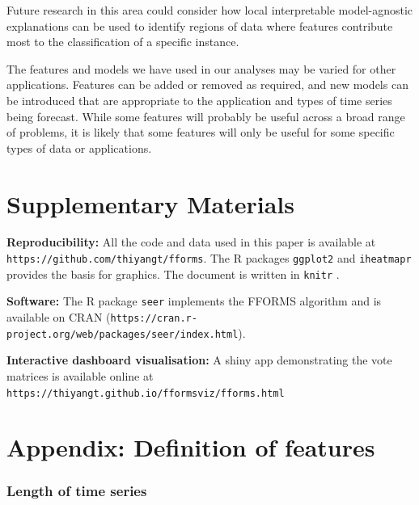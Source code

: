 \documentclass[11pt,a4paper,]{article}
\begin{document}
Future research in this area could consider how local interpretable model-agnostic explanations can be used to identify regions of data where features contribute most to the classification of a specific instance.

The features and models we have used in our analyses may be varied for other applications. Features can be added or removed as required, and new models can be introduced that are appropriate to the application and types of time series being forecast. While some features will probably be useful across a broad range of problems, it is likely that some features will only be useful for some specific types of data or applications.

\hypertarget{supplementary-materials}{%
\section*{Supplementary Materials}\label{supplementary-materials}}

\textbf{Reproducibility:} All the code and data used in this paper is available at \texttt{https://github.com/thiyangt/fforms}. The R packages \texttt{ggplot2} \autocite{ggplot} and \texttt{iheatmapr} \autocite{iheatmapr} provides the basis for graphics. The document is written in \texttt{knitr} \autocite{xie2017dynamic}.

\textbf{Software:} The R package \texttt{seer} implements the FFORMS algorithm and is available on CRAN (\texttt{https://cran.r-project.org/web/packages/seer/index.html}).

\textbf{Interactive dashboard visualisation:} A shiny app demonstrating the vote matrices is available online at \texttt{https://thiyangt.github.io/fformsviz/fforms.html}

\clearpage

\hypertarget{appendix-definition-of-features}{%
\section*{Appendix: Definition of features}\label{appendix-definition-of-features}}

\hypertarget{length-of-time-series}{%
\subsubsection*{Length of time series}\label{length-of-time-series}}
\end{document}
